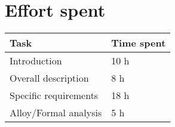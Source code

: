 \chapter{Effort spent}
\begin{tabular}{|l|l|}
	\hline
	Task & Time spent\\
	\hline
	Introduction & 10 h\\
	\hline
	Overall description & 8 h\\
	\hline
	Specific requirements & 18 h\\
	\hline
	Alloy/Formal analysis & 5 h\\
	\hline
\end{tabular}